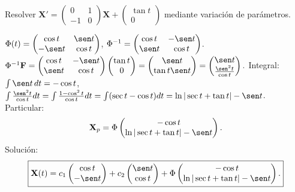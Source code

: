 \begin{prob}
Resolver $\mathbf{X}'=
\begin{pmatrix}
0&1\\
-1&0
\end{pmatrix}\mathbf{X}
+
\begin{pmatrix}
\tan t\\0
\end{pmatrix}$ mediante variación de parámetros.
\begin{myproof}
$\Phi(t)=
\begin{pmatrix}
\cos t&\sen t\\
-\sen t&\cos t
\end{pmatrix}$, $\Phi^{-1}=
\begin{pmatrix}
\cos t&-\sen t\\
\sen t&\cos t
\end{pmatrix}$.
$\Phi^{-1}\mathbf{F}=
\begin{pmatrix}
\cos t&-\sen t\\
\sen t&\cos t
\end{pmatrix}
\begin{pmatrix}
\tan t\\0
\end{pmatrix}
=
\begin{pmatrix}
\sen t\\
\tan t\sen t
\end{pmatrix}
=
\begin{pmatrix}
\sen t\\
\frac{\sen^2 t}{\cos t}
\end{pmatrix}.
$
Integral: $\int \sen t\,dt = -\cos t$, $\int \frac{\sen^2 t}{\cos t}dt = \int \frac{1-\cos^2 t}{\cos t}dt = \int(\sec t-\cos t)dt = \ln|\sec t+\tan t|-\sen t$.
Particular:
\[
\mathbf{X}_p=\Phi
\begin{pmatrix}
-\cos t\\
\ln|\sec t+\tan t|-\sen t
\end{pmatrix}.
\]
Solución:
\[
\boxed{
\mathbf{X}(t)=c_1
\begin{pmatrix}
\cos t\\-\sen t
\end{pmatrix}
+c_2
\begin{pmatrix}
\sen t\\\cos t
\end{pmatrix}
+
\Phi
\begin{pmatrix}
-\cos t\\
\ln|\sec t+\tan t|-\sen t
\end{pmatrix}.
}
\]
\end{myproof}
\end{prob}

